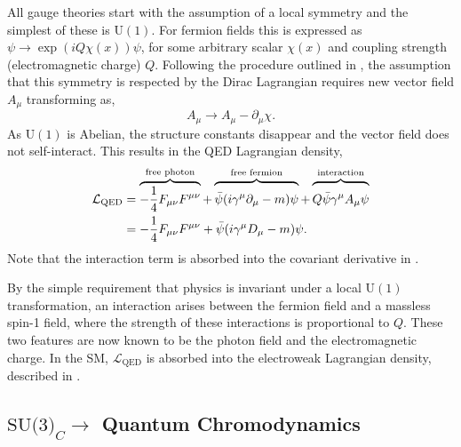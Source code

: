 All gauge theories start with the assumption of a local symmetry and the simplest of these is $\text{U}(1)$.
For fermion fields this is expressed as $\psi \rightarrow \exp{\left(i Q \chi(x)\right)} \psi$, for some arbitrary scalar $\chi(x)$ and coupling strength (electromagnetic charge) $Q$.
Following the procedure outlined in , the assumption that this symmetry is respected by the Dirac Lagrangian requires new vector field $A_\mu$ transforming as,
\begin{equation}
    \label{eq:photon_transformation}
    A_\mu \rightarrow A_\mu - \partial_\mu \chi.
\end{equation}
As $\text{U}(1)$ is Abelian, the structure constants disappear and the vector field does not self-interact.
This results in the QED Lagrangian density,
\begin{align}
    \mathcal{L}_\text{QED} & = \overbrace{-\frac{1}{4} F_{\mu\nu} F^{\mu\nu}}^{\text{free photon}}
    + \overbrace{\vphantom{\frac{1}{1}}\bar \psi (i \gamma^\mu \partial_\mu - m) \psi}^{\text{free fermion}}
    + \overbrace{\vphantom{\frac{1}{1}}Q \bar \psi \gamma^\mu A_\mu \psi}^{\text{interaction}}               \\
                           & = -\frac{1}{4} F_{\mu\nu} F^{\mu\nu} + \bar \psi (i \gamma^\mu D_\mu - m) \psi.
    \label{eq:qed_lagrangian}
\end{align}
Note that the interaction term is absorbed into the covariant derivative in .

By the simple requirement that physics is invariant under a local $\text{U}(1)$ transformation, an interaction arises between the fermion field and a massless spin-1 field, where the strength of these interactions is proportional to $Q$.
These two features are now known to be the photon field and the electromagnetic charge.
In the SM, $\mathcal{L}_\text{QED}$ is absorbed into the electroweak Lagrangian density, described in .

\subsection{\texorpdfstring{$\text{SU(3)}_C\rightarrow$}{SU(3)-} Quantum Chromodynamics}
\label{sec:qcd}

